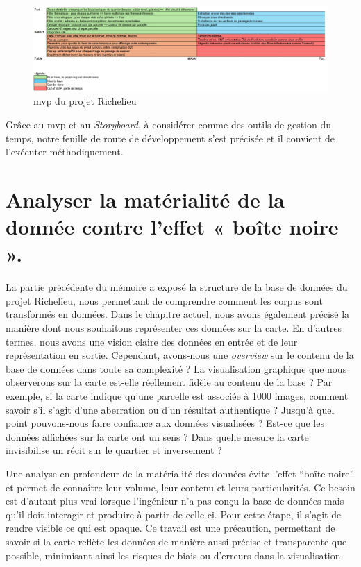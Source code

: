 \begin{figure}[h!]
    \centering
    \includegraphics[width=1\linewidth]{images/MVP.png}
    \caption{ \acrshort{mvp} du projet Richelieu}
    \label{fig:mvp}
\end{figure}

Grâce au  \acrshort{mvp} et au \textit{Storyboard}, à considérer comme des outils de gestion du temps, notre feuille de route de développement s'est précisée et il convient de l'exécuter méthodiquement. 

\section{Analyser la matérialité de la donnée contre l'effet « boîte noire ».}
La partie précédente du mémoire a exposé la structure de la base de données du projet Richelieu, nous permettant de comprendre comment les corpus sont transformés en données. Dans le chapitre actuel, nous avons également précisé la manière dont nous souhaitons représenter ces données sur la carte. En d'autres termes, nous avons une vision claire des données en entrée et de leur représentation en sortie. Cependant, avons-nous une \textit{overview} sur le contenu de la base de données dans toute sa complexité ? La visualisation graphique que nous observerons sur la carte est-elle réellement fidèle au contenu de la base ? Par exemple, si la carte indique qu'une parcelle est associée à 1000 images, comment savoir s'il s'agit d'une aberration ou d'un résultat authentique ? Jusqu'à quel point pouvons-nous faire confiance aux données visualisées ?  Est-ce que les données affichées sur la carte ont un sens ? Dans quelle mesure la carte invisibilise un récit sur le quartier et inversement ? 

Une analyse en profondeur de la matérialité des données évite l'effet \enquote{boîte noire} et permet de connaître leur volume, leur contenu et leurs particularités. Ce besoin est d'autant plus vrai lorsque l'ingénieur n'a pas conçu la base de données mais qu'il doit interagir et produire à partir de celle-ci. Pour cette étape, il s'agit de rendre visible ce qui est opaque. Ce travail est une précaution, permettant de savoir si la carte reflète les données de manière aussi précise et transparente que possible, minimisant ainsi les risques de biais ou d'erreurs dans la visualisation.

